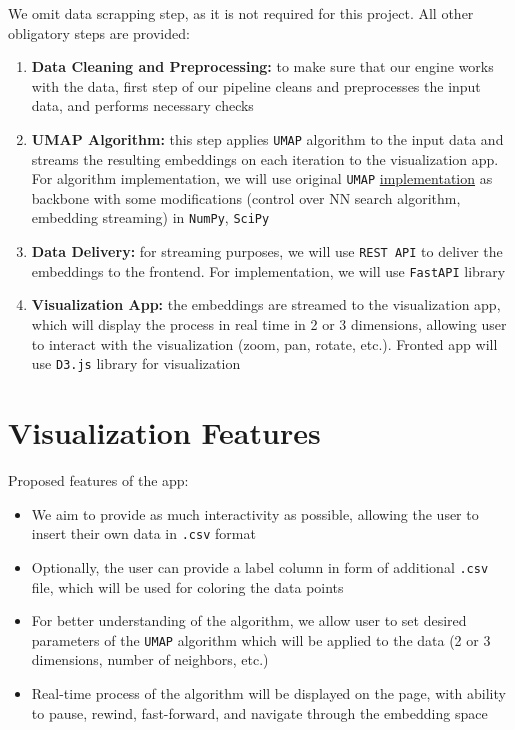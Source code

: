 \documentclass{article}
\begin{document}
We omit data scrapping step, as it is not required for this project.
All other obligatory steps are provided:
\begin{enumerate}
	\item \textbf{Data Cleaning and Preprocessing:} to make sure that
	      our engine works with the data, first step of our pipeline cleans
	      and preprocesses the input data, and performs necessary checks
	\item \textbf{UMAP Algorithm:} this step applies \texttt{UMAP}
	      algorithm to the input data and streams the resulting
	      embeddings on each iteration to the visualization app. For
	      algorithm implementation, we will use original \texttt{UMAP}
	      \href{https://github.com/lmcinnes/umap/}{implementation}
	      as backbone with some modifications (control over NN search
	      algorithm, embedding streaming) in \texttt{NumPy},
	      \texttt{SciPy}
	\item \textbf{Data Delivery:} for streaming purposes, we will use
	      \texttt{REST API} to deliver the embeddings to the frontend.
	      For implementation, we will use \texttt{FastAPI} library
	\item \textbf{Visualization App:} the embeddings are streamed to the
	      visualization app, which will display the process in real time
	      in 2 or 3 dimensions, allowing user to interact with the
	      visualization (zoom, pan, rotate, etc.). Fronted app will use
	      \texttt{D3.js} library for visualization
\end{enumerate}

\section{Visualization Features}
Proposed features of the app:
\begin{itemize}
	\item We aim to provide as much interactivity as possible, allowing
	      the user to insert their own data in \texttt{.csv} format
	\item Optionally, the user can provide a label column in form of
	      additional \texttt{.csv} file, which will be used for coloring
	      the data points
	\item For better understanding of the algorithm, we allow user to
	      set desired parameters of the \texttt{UMAP} algorithm which will
	      be applied to the data
	      (2 or 3 dimensions, number of neighbors, etc.)
	\item Real-time process of the algorithm will be displayed
	      on the page, with ability to pause, rewind, fast-forward, and
	      navigate through the embedding space
\end{itemize}
\end{document}
